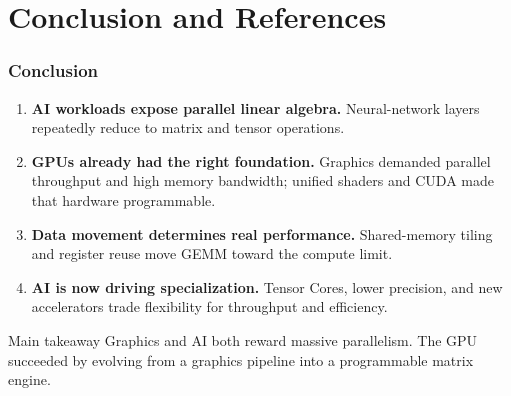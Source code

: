 \documentclass[main.tex]{subfiles}
\begin{document}
\section{Conclusion and References}
\begin{frame}
  \frametitle{Conclusion}
  \begin{enumerate}
    \item \textbf{AI workloads expose parallel linear algebra.}
      Neural-network layers repeatedly reduce to matrix and tensor operations.
    \item \textbf{GPUs already had the right foundation.}
      Graphics demanded parallel throughput and high memory bandwidth; unified shaders and CUDA made that hardware programmable.
    \item \textbf{Data movement determines real performance.}
      Shared-memory tiling and register reuse move GEMM toward the compute limit.
    \item \textbf{AI is now driving specialization.}
      Tensor Cores, lower precision, and new accelerators trade flexibility for throughput and efficiency.
  \end{enumerate}

  \begin{alertblock}{Main takeaway}
    Graphics and AI both reward massive parallelism. The GPU succeeded by evolving from a graphics pipeline into a programmable matrix engine.
  \end{alertblock}
\end{frame}
\end{document}
